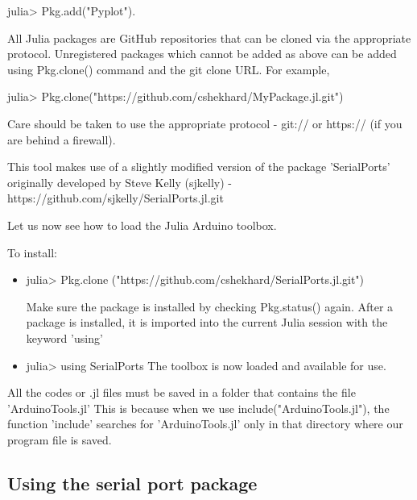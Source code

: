 julia> Pkg.add("Pyplot").

All Julia packages are GitHub repositories that can be cloned via the appropriate protocol. Unregistered packages which cannot be added as above can be added using Pkg.clone() command and the git clone URL. For example,

julia> Pkg.clone("https://github.com/cshekhard/MyPackage.jl.git") 

Care should be taken to use the appropriate protocol - git:// or https:// (if you are behind a firewall). 

This tool makes use of a slightly modified version of the package 'SerialPorts' originally developed by Steve Kelly (sjkelly) - https://github.com/sjkelly/SerialPorts.jl.git 

Let us now see how to load the Julia Arduino toolbox. 


To install:
\begin {itemize}
\item julia> Pkg.clone ("https://github.com/cshekhard/SerialPorts.jl.git")

Make sure the package is installed by checking Pkg.status() again.
After a package is installed, it is imported into the current Julia session with the keyword 'using'

\item julia> using SerialPorts
The toolbox is now loaded and available for use. 

\end{itemize}

All the codes or .jl files must be saved in a folder that contains the file 'ArduinoTools.jl'
This is because when we use include("ArduinoTools.jl"), the function 'include' searches for 'ArduinoTools.jl' only in that directory where our program file is saved.




\subsection{Using the serial port package}

